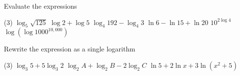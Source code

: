 \begin{Exercise}[title={Logarithmic Functions},label=exLogFunctions]
\Question Evaluate the expressions
\begin{tasks}(3)
	\task $\log _{5} \sqrt{125}$	%
	\task $\log  2 +\log  5$		%
	\task $\log _{4} 192 -\log _{4} 3$	%
	\task $\ln  6 -\ln  15 +\ln  20$	%
	\task $10^{2 \log  4}$ 			%
	\task $\log  \left (\log  1000^{10,000}\right )$	%
\end{tasks}
	
	\Question Rewrite the expression as a single logarithm
	\begin{tasks}(3)
		\task $\log _{3} 5 +5 \log _{3} 2$	%
		\task $\log _{2} A +\log _{2} B -2 \log _{2} C$%
		\task $\ln  5 +2 \ln  x +3 \ln  \left (x^{2} +5\right )$ %
		\end{tasks}
	

\end{Exercise}	

